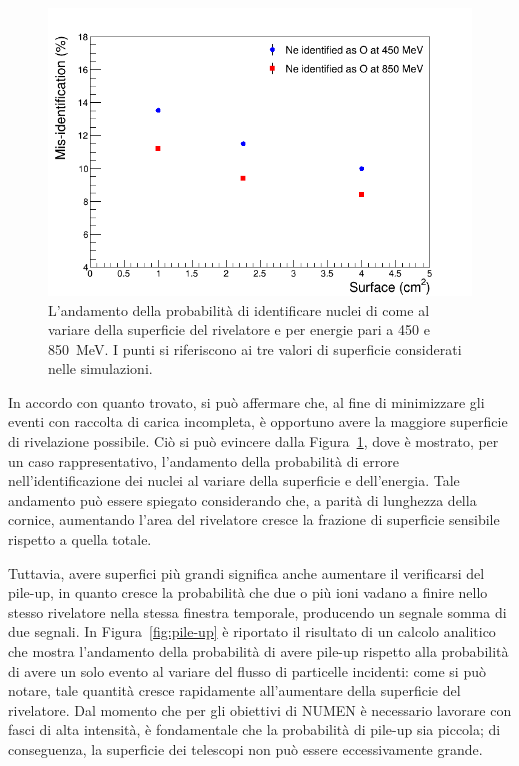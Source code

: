 \begin{figure} [!t]
	\centering
	\includegraphics[width=\textwidth, keepaspectratio]{Grafici_Tesi/Granularita/misident_surface3.png}
	\caption{L'andamento della probabilità di identificare nuclei di  come  al variare della superficie del rivelatore e per energie pari a 450 e 850~MeV. I punti si riferiscono ai tre valori di superficie considerati nelle simulazioni.} \label{fig:misident_vs_surface}
\end{figure}




In accordo con quanto trovato, si può affermare che, al fine di minimizzare gli eventi con raccolta di carica incompleta, è opportuno avere la maggiore superficie di rivelazione possibile.
Ciò si può evincere dalla Figura~\ref{fig:misident_vs_surface}, dove è mostrato, per un caso rappresentativo, l'andamento della probabilità di errore nell'identificazione dei nuclei al variare della superficie e dell'energia.
Tale andamento può essere spiegato considerando che, a parità di lunghezza della cornice, aumentando l'area del rivelatore cresce la frazione di superficie sensibile rispetto a quella totale.



Tuttavia, avere superfici più grandi significa anche aumentare il verificarsi del pile-up, in quanto cresce la probabilità che due o più ioni vadano a finire nello stesso rivelatore nella stessa finestra temporale, producendo un segnale somma di due segnali.
In Figura~\ref{fig:pile-up} è riportato il risultato di un calcolo analitico che mostra l'andamento della probabilità di avere pile-up rispetto alla probabilità di avere un solo evento al variare del flusso di particelle incidenti: come si può notare, tale quantità cresce rapidamente all'aumentare della superficie del rivelatore.
Dal momento che per gli obiettivi di NUMEN è necessario lavorare con fasci di alta intensità, è fondamentale che la probabilità di pile-up sia piccola; di conseguenza, la superficie dei telescopi non può essere eccessivamente grande.


